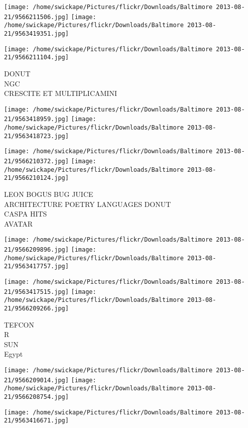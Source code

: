 \documentclass[10pt,letterpaper]{article}
\begin{document}
\texttt{[image: /home/swickape/Pictures/flickr/Downloads/Baltimore 2013-08-21/9566211506.jpg]}
\texttt{[image: /home/swickape/Pictures/flickr/Downloads/Baltimore 2013-08-21/9563419351.jpg]}

\vspace{0.25in}
\texttt{[image: /home/swickape/Pictures/flickr/Downloads/Baltimore 2013-08-21/9566211104.jpg]}

DONUT\\
NGC\\
CRESCITE ET MULTIPLICAMINI\\
\pagebreak

\texttt{[image: /home/swickape/Pictures/flickr/Downloads/Baltimore 2013-08-21/9563418959.jpg]}
\texttt{[image: /home/swickape/Pictures/flickr/Downloads/Baltimore 2013-08-21/9563418723.jpg]}

\texttt{[image: /home/swickape/Pictures/flickr/Downloads/Baltimore 2013-08-21/9566210372.jpg]}
\texttt{[image: /home/swickape/Pictures/flickr/Downloads/Baltimore 2013-08-21/9566210124.jpg]}

LEON BOGUS BUG JUICE\\
ARCHITECTURE POETRY LANGUAGES DONUT\\
CASPA HITS\\
AVATAR\\
\pagebreak

\texttt{[image: /home/swickape/Pictures/flickr/Downloads/Baltimore 2013-08-21/9566209896.jpg]}
\texttt{[image: /home/swickape/Pictures/flickr/Downloads/Baltimore 2013-08-21/9563417757.jpg]}

\texttt{[image: /home/swickape/Pictures/flickr/Downloads/Baltimore 2013-08-21/9563417515.jpg]}
\texttt{[image: /home/swickape/Pictures/flickr/Downloads/Baltimore 2013-08-21/9566209266.jpg]}

TEFCON\\
R\\
SUN\\
Egypt\\
\pagebreak

\texttt{[image: /home/swickape/Pictures/flickr/Downloads/Baltimore 2013-08-21/9566209014.jpg]}
\texttt{[image: /home/swickape/Pictures/flickr/Downloads/Baltimore 2013-08-21/9566208754.jpg]}

\texttt{[image: /home/swickape/Pictures/flickr/Downloads/Baltimore 2013-08-21/9563416671.jpg]}
\end{document}
